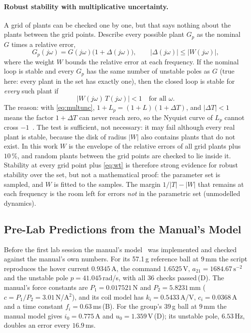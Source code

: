 \documentclass[11pt,a4paper]{article}
\newcommand{\st}[1]{\,\textup{(#1)}}
\begin{document}
\paragraph{Robust stability with multiplicative uncertainty.} A grid of plants can be checked one by one, but that says
nothing about the plants between the grid points. Describe every possible plant $G_p$ as the nominal $G$ times a
relative error,
\begin{equation}
G_p(j\omega) = G(j\omega)\bigl(1 + \Delta(j\omega)\bigr), \qquad |\Delta(j\omega)| \le |W(j\omega)| ,
\label{eq:multunc}
\end{equation}
where the weight $W$ bounds the relative error at each frequency. If the nominal loop is stable and every $G_p$ has the
same number of unstable poles as $G$ (true here: every plant in the set has exactly one), then the closed loop is stable
for \emph{every} such plant if
\begin{equation}
|W(j\omega)\,T(j\omega)| < 1 \quad \text{for all } \omega .
\label{eq:wt}
\end{equation}
The reason: with \eqref{eq:multunc}, $1+L_p = (1+L)(1+\Delta T)$, and $|\Delta T|<1$ means the factor $1+\Delta T$ can never
reach zero, so the Nyquist curve of $L_p$ cannot cross $-1$~\cite{skogestad}. The test is sufficient, not necessary: it may
fail although every real plant is stable, because the disk of radius $|W|$ also contains plants that do not exist. In this
work $W$ is the envelope of the relative errors of all grid plants plus $10\,\%$, and random plants between the grid
points are checked to lie inside it. Stability at every grid point plus \eqref{eq:wt} is therefore strong evidence for
robust stability over the set, but not a mathematical proof: the parameter set is sampled, and $W$ is fitted to the
samples. The margin $1/|T| - |W|$ that remains at each frequency is the room left for errors \emph{not} in the parametric
set (unmodelled dynamics).

\subsection{Pre-Lab Predictions from the Manual's Model}
\label{sec:th-prelab}
Before the first lab session the manual's model~\cite{mlsmanual} was implemented and checked against the manual's own
numbers. For its 57.1\,g reference ball at $9$\,mm the script reproduces the hover current $0.9345$\,A, the command
$1.6525$\,V, $a_{21}=1684.67\,\text{s}^{-2}$ and the unstable pole $p = 41.045$\,rad/s, with all 36 checks passed\st{D}.
The manual's force constants are $P_1 = 0.017521$\,N and $P_2 = 5.8231$\,mm ($c = P_1/P_2 = 3.01$\,N/A$^2$), and its
coil model has $k_i = 0.5433$\,A/V, $c_i = 0.0368$\,A and a time constant $f_i = 0.63$\,ms\st{B}. For the group's 39\,g
ball at $9$\,mm the manual model gives $i_0 = 0.775$\,A and $u_0 = 1.359$\,V\st{D}; its unstable pole, $6.53$\,Hz, doubles
an error every $16.9$\,ms.
\end{document}
